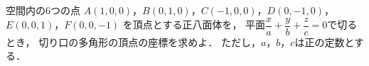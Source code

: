 \documentclass[../../main.tex]{subfiles}
\begin{document}
空間内の6つの点
$A(1,0,0)$，$B(0,1,0)$，$C(-1,0,0)$，$D(0,-1,0)$，$E(0,0,1)$，$F(0,0,-1)$
を頂点とする正八面体を，
平面$\displaystyle\dfrac{x}{a}+\dfrac{y}{b}+\dfrac{z}{c}=0$で切るとき，
切り口の多角形の頂点の座標を求めよ．
ただし，$a$，$b$，$c$は正の定数とする．
\end{document}
